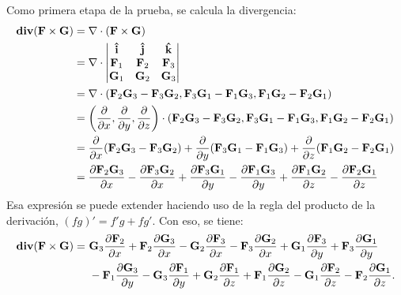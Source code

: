\documentclass{fmbvecto}
\begin{document}
\begin{problema}
Como primera etapa de la prueba, se calcula la divergencia:
\begin{align*}
    \div (\bvec{F} \times \bvec{G}) &= \nabla \cdot (\bvec{F} \times \bvec{G}) \\
    &= \nabla \cdot \begin{vmatrix}
        \uvec{i} & \uvec{j} & \uvec{k} \\
        \bvec{F}_1 & \bvec{F}_2 & \bvec{F}_3 \\
        \bvec{G}_1 & \bvec{G}_2 & \bvec{G}_3
    \end{vmatrix} \\
    &= \nabla \cdot (\bvec{F}_2 \bvec{G}_3 - \bvec{F}_3 \bvec{G}_2, \bvec{F}_3 \bvec{G}_1 - \bvec{F}_1 \bvec{G}_3, \bvec{F}_1 \bvec{G}_2 - \bvec{F}_2 \bvec{G}_1) \\
    &= \left(\frac{\partial}{\partial x},\frac{\partial}{\partial y},\frac{\partial}{\partial z}\right) \cdot (\bvec{F}_2 \bvec{G}_3 - \bvec{F}_3 \bvec{G}_2, \bvec{F}_3 \bvec{G}_1 - \bvec{F}_1 \bvec{G}_3, \bvec{F}_1 \bvec{G}_2 - \bvec{F}_2 \bvec{G}_1) \\
    &= \frac{\partial}{\partial x}(\bvec{F}_2 \bvec{G}_3 - \bvec{F}_3 \bvec{G}_2) + \frac{\partial}{\partial y}(\bvec{F}_3 \bvec{G}_1 - \bvec{F}_1 \bvec{G}_3) + \frac{\partial}{\partial z}(\bvec{F}_1 \bvec{G}_2 - \bvec{F}_2 \bvec{G}_1) \\
    &= \frac{\partial \bvec{F}_2 \bvec{G}_3}{\partial x} - \frac{\partial \bvec{F}_3 \bvec{G}_2}{\partial x} + \frac{\partial \bvec{F}_3 \bvec{G}_1}{\partial y} - \frac{\partial \bvec{F}_1 \bvec{G}_3}{\partial y} + \frac{\partial \bvec{F}_1 \bvec{G}_2}{\partial z} - \frac{\partial \bvec{F}_2 \bvec{G}_1}{\partial z}
\end{align*}
Esa expresión se puede extender haciendo uso de la regla del producto de la derivación, \((fg)' = f'g + fg'\). Con eso, se tiene:
\begin{align*}
    \div (\bvec{F} \times \bvec{G}) = \ & \bvec{G}_3\frac{\partial \bvec{F}_2}{\partial x} + \bvec{F}_2\frac{\partial  \bvec{G}_3}{\partial x} - \bvec{G}_2\frac{\partial \bvec{F}_3 }{\partial x} - \bvec{F}_3\frac{\partial \bvec{G}_2}{\partial x} + \bvec{G}_1\frac{\partial \bvec{F}_3}{\partial y} + \bvec{F}_3\frac{\partial \bvec{G}_1}{\partial y} \\ & - \bvec{F}_1\frac{\partial \bvec{G}_3}{\partial y} - \bvec{G}_3\frac{\partial \bvec{F}_1}{\partial y} + \bvec{G}_2 \frac{\partial \bvec{F}_1}{\partial z} + \bvec{F}_1\frac{\partial \bvec{G}_2}{\partial z} - \bvec{G}_1\frac{\partial \bvec{F}_2}{\partial z} - \bvec{F}_2\frac{\partial \bvec{G}_1}{\partial z}.

\end{align*}
\end{problema}
\end{document}
